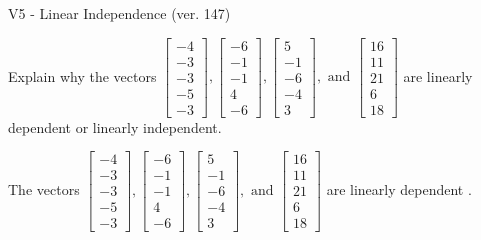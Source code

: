 \begin{exercise}
  \begin{exerciseTitle}V5 - Linear Independence (ver. 147)\end{exerciseTitle}
  \begin{exerciseStatement}
    Explain why the vectors \(\left[\begin{array}{r}
-4 \\
-3 \\
-3 \\
-5 \\
-3
\end{array}\right] , \left[\begin{array}{r}
-6 \\
-1 \\
-1 \\
4 \\
-6
\end{array}\right] , \left[\begin{array}{r}
5 \\
-1 \\
-6 \\
-4 \\
3
\end{array}\right] , \text{ and } \left[\begin{array}{r}
16 \\
11 \\
21 \\
6 \\
18
\end{array}\right]\) are linearly dependent or linearly independent.	


  \end{exerciseStatement}
  \begin{exerciseAnswer}
   The vectors \(\left[\begin{array}{r}
-4 \\
-3 \\
-3 \\
-5 \\
-3
\end{array}\right] , \left[\begin{array}{r}
-6 \\
-1 \\
-1 \\
4 \\
-6
\end{array}\right] , \left[\begin{array}{r}
5 \\
-1 \\
-6 \\
-4 \\
3
\end{array}\right] , \text{ and } \left[\begin{array}{r}
16 \\
11 \\
21 \\
6 \\
18
\end{array}\right]\) are 
  	 linearly dependent  .
  


  \end{exerciseAnswer}
\end{exercise}